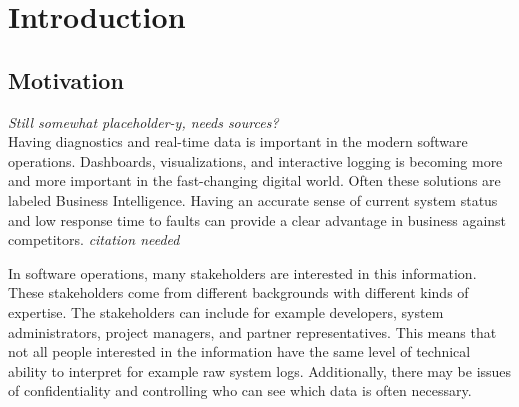 \documentclass[english,12pt,a4paper,pdftex,sci,utf8]{aaltothesis}
\newcommand{\nyi}[1]{\colorbox{nyibg}{\textcolor{nyitext}{\emph{#1}}}}
\begin{document}
\cleardoublepage
\storeinipagenumber
{}
\setcounter{page}{1}


\section{Introduction}
\thispagestyle{empty}

\subsection{Motivation}
\nyi{Still somewhat placeholder-y, needs sources?} \\

Having diagnostics and real-time data is important in the modern software operations.
Dashboards, visualizations, and interactive logging is becoming more and more important
in the fast-changing digital world. Often these solutions are labeled Business Intelligence.
Having an accurate sense of current system status and low response time to faults can provide a clear advantage
in business against competitors. \nyi{citation needed}


In software operations, many stakeholders are interested in this information. 
These stakeholders come from different backgrounds with different kinds of expertise.
The stakeholders can include for example developers, system administrators, project managers, and partner representatives.
This means that not all people interested in the information have the same level of technical ability to 
interpret for example raw system logs. Additionally, there may be issues of confidentiality and
controlling who can see which data is often necessary.
\end{document}

